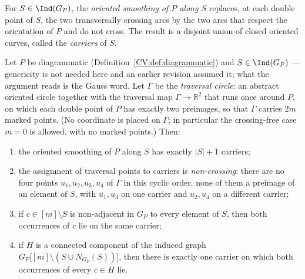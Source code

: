 \begin{definition}\label{CV:def:smoothing}\leanok
For $S\in\Ind(G_P)$, the \emph{oriented smoothing of $P$ along $S$} replaces, at
each double point of $S$, the two transversally crossing arcs by the two arcs
that respect the orientation of $P$ and do not cross. The result is a disjoint
union of closed oriented curves, called the \emph{carriers} of $S$.
\end{definition}

\begin{lemma}\label{CV:lem:carriers}\leanok
Let $P$ be diagrammatic (Definition~\ref{CV:def:diagrammatic}) and
$S\in\Ind(G_P)$ --- genericity is not needed here and an earlier revision
assumed it; what the argument reads is the Gauss word. Let $\Gamma$ be the
\emph{traversal circle}: an abstract oriented circle
together with the traversal map $\Gamma\to\mathbb R^2$ that runs once around
$P$, on which each double point of $P$ has exactly two preimages, so that
$\Gamma$ carries $2m$ marked points. (No coordinate is placed on $\Gamma$; in
particular the crossing-free case $m=0$ is allowed, with no marked points.) Then:
\begin{enumerate}
\item[(i)] the oriented smoothing of $P$ along $S$ has exactly $|S|+1$ carriers;
\item[(ii)] the assignment of traversal points to carriers is \emph{non-crossing}:
there are no four points $u_1,u_2,u_3,u_4$ of $\Gamma$ in this cyclic order,
none of them a preimage of an element of $S$, with $u_1,u_3$ on one carrier and
$u_2,u_4$ on a different carrier;
\item[(iii)] if $c\in[m]\setminus S$ is non-adjacent in $G_P$ to every element of
$S$, then both occurrences of $c$ lie on the same carrier;
\item[(iv)] if $H$ is a connected component of the induced graph
$G_P\bigl[[m]\setminus(S\cup N_{G_P}(S))\bigr]$, then there is exactly one
carrier on which both occurrences of every $c\in H$ lie.
\end{enumerate}
\end{lemma}
